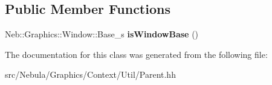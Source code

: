 \subsection*{\-Public \-Member \-Functions}
\begin{DoxyCompactItemize}
\item 
\hypertarget{classNeb_1_1Graphics_1_1Context_1_1Util_1_1Parent_a1192e2c45689755ab1ddde0de5610dae}{\-Neb\-::\-Graphics\-::\-Window\-::\-Base\-\_\-s {\bfseries is\-Window\-Base} ()}\label{classNeb_1_1Graphics_1_1Context_1_1Util_1_1Parent_a1192e2c45689755ab1ddde0de5610dae}

\end{DoxyCompactItemize}


\-The documentation for this class was generated from the following file\-:\begin{DoxyCompactItemize}
\item 
src/\-Nebula/\-Graphics/\-Context/\-Util/\-Parent.\-hh\end{DoxyCompactItemize}
